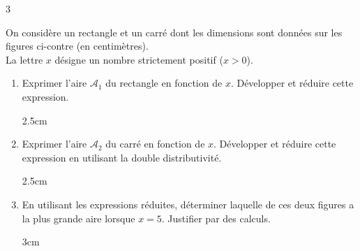 \documentclass[a4paper]{book}
\begin{document}
{\begin{exerciceNote}{3}
        \medskip
        \begin{minipage}{0.55\textwidth}
            On considère un rectangle et un carré dont les dimensions sont données sur les figures ci-contre (en centimètres). \\
            La lettre $x$ désigne un nombre strictement positif ($x > 0$).
        \end{minipage}\hfill
        \begin{minipage}{0.4\textwidth}
            \begin{center}
            \end{center}
        \end{minipage}
    
        \smallskip
        \begin{enumerate}
            \item Exprimer l'aire $\mathcal{A}_1$ du rectangle en fonction de $x$. Développer et réduire cette expression.
            \begin{ZoneReponse}{2.5cm}
            \end{ZoneReponse}
            
            \item Exprimer l'aire $\mathcal{A}_2$ du carré en fonction de $x$. Développer et réduire cette expression en utilisant la double distributivité.
            \begin{ZoneReponse}{2.5cm}
            \end{ZoneReponse}
            
            \item En utilisant les expressions réduites, déterminer laquelle de ces deux figures a la plus grande aire lorsque $x = 5$. Justifier par des calculs.
            \begin{ZoneReponse}{3cm}
            \end{ZoneReponse}
        \end{enumerate}
    \end{exerciceNote}
    
}
\end{document}
